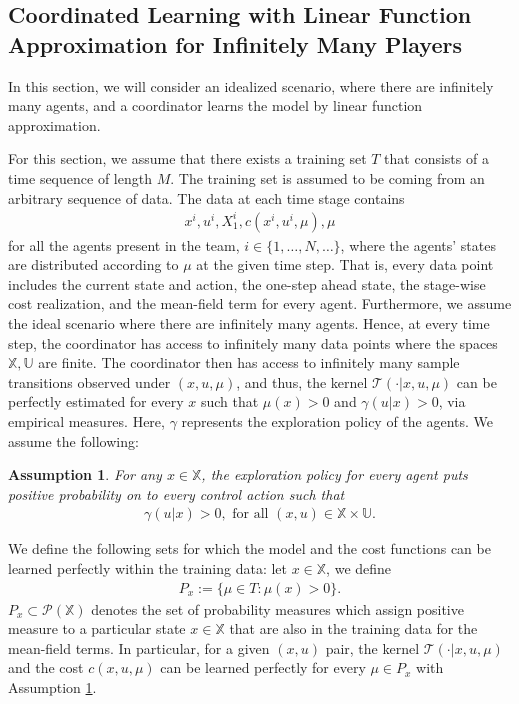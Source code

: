 \documentclass[twoside,11pt]{article}
\newtheorem{assumption}{Assumption}[section]
\def\P{{\mathcal P}}
\begin{document}
\subsection{Coordinated Learning with Linear Function Approximation for Infinitely Many Players}\label{coor_learn_sec}
In this section, we will consider an idealized scenario, where there are infinitely many agents, and a coordinator learns the model by linear function approximation. 




 For this section, we assume that there exists a training set $T$ that consists of a time sequence of length $M$. The training set is assumed to be coming from an arbitrary sequence of data. The data at each time stage contains  
\begin{align*}
x^i,u^i,X_1^i,c(x^i,u^i,\mu),\mu
\end{align*}
for all the agents present in the team, $i\in\{1,\dots,N,\dots\}$, where the agents' states are distributed according to $\mu$ at the given time step.
 That is, every data point includes the current state and action, the one-step ahead state, the stage-wise cost realization, and the mean-field term for every agent. Furthermore, we assume the ideal scenario where there are infinitely many agents. Hence, at every time step, the coordinator has access to infinitely many data points where the spaces $\mathds{X},\mathds{U}$ are finite. The coordinator then has access to infinitely many sample transitions observed under $(x, u, \mu)$, and thus, the kernel $\mathcal{T}(\cdot|x,u,\mu)$ can be perfectly estimated for every $x$ such that $\mu(x)>0$ and $\gamma(u|x)>0$, via empirical measures. Here, $\gamma$ represents the exploration policy of the agents.   We assume the following:
 \begin{assumption}\label{pos_expo}
     For any $x\in\mathds{X}$, the exploration policy for every agent puts positive probability on to every control action such that
     \begin{align*}
         \gamma(u|x)>0, \text{ for all } (x,u)\in\mathds{X\times U}.
     \end{align*}
 \end{assumption}

 We define the following sets for which the model and the cost functions can be learned perfectly within the training data: let $x\in\mathds{X}$, we define
 \begin{align}\label{learned_set}
P_x:=\{\mu\in T: \mu(x)>0\}.
 \end{align}
$P_x\subset \P(\mathds{X})$ denotes the set of probability measures which assign positive measure to a particular state $x\in\mathds{X}$ that are also in the training data for the mean-field terms. In particular, for a given $(x,u)$ pair,  the kernel $\mathcal{T}(\cdot|x,u,\mu)$ and the cost $c(x,u,\mu)$ can be  learned perfectly for every $\mu\in P_x$ with Assumption \ref{pos_expo}. 
 
\end{document}
